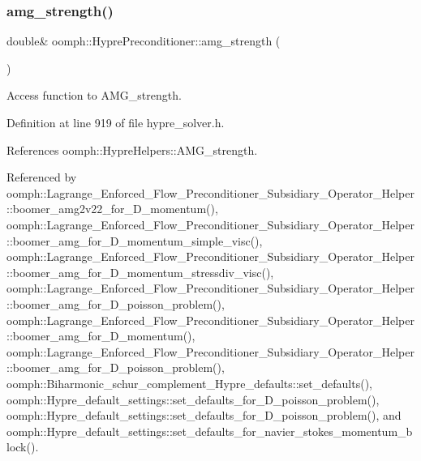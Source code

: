 \mbox{\label{classoomph_1_1HyprePreconditioner_a1ec949391111062df52ac15f7dc81525}} 
\subsubsection{\texorpdfstring{amg\+\_\+strength()}{amg\_strength()}}
{\footnotesize\ttfamily double\& oomph\+::\+Hypre\+Preconditioner\+::amg\+\_\+strength (\begin{DoxyParamCaption}{ }\end{DoxyParamCaption})\hspace{0.3cm}{\ttfamily [inline]}}



Access function to A\+M\+G\+\_\+strength. 



Definition at line 919 of file hypre\+\_\+solver.\+h.



References oomph\+::\+Hypre\+Helpers\+::\+A\+M\+G\+\_\+strength.



Referenced by oomph\+::\+Lagrange\+\_\+\+Enforced\+\_\+\+Flow\+\_\+\+Preconditioner\+\_\+\+Subsidiary\+\_\+\+Operator\+\_\+\+Helper\+::boomer\+\_\+amg2v22\+\_\+for\+\_\+D\+\_\+momentum(), oomph\+::\+Lagrange\+\_\+\+Enforced\+\_\+\+Flow\+\_\+\+Preconditioner\+\_\+\+Subsidiary\+\_\+\+Operator\+\_\+\+Helper\+::boomer\+\_\+amg\+\_\+for\+\_\+D\+\_\+momentum\+\_\+simple\+\_\+visc(), oomph\+::\+Lagrange\+\_\+\+Enforced\+\_\+\+Flow\+\_\+\+Preconditioner\+\_\+\+Subsidiary\+\_\+\+Operator\+\_\+\+Helper\+::boomer\+\_\+amg\+\_\+for\+\_\+D\+\_\+momentum\+\_\+stressdiv\+\_\+visc(), oomph\+::\+Lagrange\+\_\+\+Enforced\+\_\+\+Flow\+\_\+\+Preconditioner\+\_\+\+Subsidiary\+\_\+\+Operator\+\_\+\+Helper\+::boomer\+\_\+amg\+\_\+for\+\_\+D\+\_\+poisson\+\_\+problem(), oomph\+::\+Lagrange\+\_\+\+Enforced\+\_\+\+Flow\+\_\+\+Preconditioner\+\_\+\+Subsidiary\+\_\+\+Operator\+\_\+\+Helper\+::boomer\+\_\+amg\+\_\+for\+\_\+D\+\_\+momentum(), oomph\+::\+Lagrange\+\_\+\+Enforced\+\_\+\+Flow\+\_\+\+Preconditioner\+\_\+\+Subsidiary\+\_\+\+Operator\+\_\+\+Helper\+::boomer\+\_\+amg\+\_\+for\+\_\+D\+\_\+poisson\+\_\+problem(), oomph\+::\+Biharmonic\+\_\+schur\+\_\+complement\+\_\+\+Hypre\+\_\+defaults\+::set\+\_\+defaults(), oomph\+::\+Hypre\+\_\+default\+\_\+settings\+::set\+\_\+defaults\+\_\+for\+\_\+D\+\_\+poisson\+\_\+problem(), oomph\+::\+Hypre\+\_\+default\+\_\+settings\+::set\+\_\+defaults\+\_\+for\+\_\+D\+\_\+poisson\+\_\+problem(), and oomph\+::\+Hypre\+\_\+default\+\_\+settings\+::set\+\_\+defaults\+\_\+for\+\_\+navier\+\_\+stokes\+\_\+momentum\+\_\+block().

